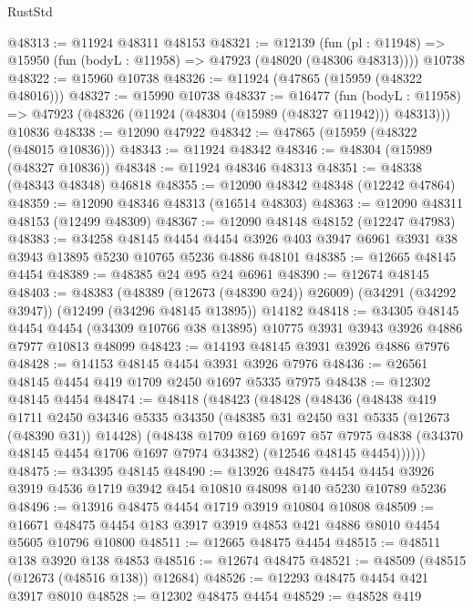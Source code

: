 \begin{lexlean}{RustStd}
\begin{coremodule}
{\begin{coremodule}
{{{{{{{{{{{{{{{{{{{{{{{{{{{{{{{{{{{{{{{{{{{{{{{{{{{{{{{{{{{{{{{{{{{{{{{{{{{{{{{{@48313 := @11924 @48311 @48153
@48321 := @12139
    (fun (pl : @11948) => @15950 (fun (bodyL : @11958) => @47923 (@48020 (@48306 @48313))))
    @10738
@48322 := @15960 @10738
@48326 := @11924 (@47865 (@15959 (@48322 @48016)))
@48327 := @15990 @10738
@48337 := @16477
    (fun (bodyL : @11958) => @47923 (@48326 (@11924 (@48304 (@15989 (@48327 @11942))) @48313)))
    @10836
@48338 := @12090 @47922
@48342 := @47865 (@15959 (@48322 (@48015 @10836)))
@48343 := @11924 @48342
@48346 := @48304 (@15989 (@48327 @10836))
@48348 := @11924 @48346 @48313
@48351 := @48338 (@48343 @48348) @46818
@48355 := @12090 @48342 @48348 (@12242 @47864)
@48359 := @12090 @48346 @48313 (@16514 @48303)
@48363 := @12090 @48311 @48153 (@12499 @48309)
@48367 := @12090 @48148 @48152 (@12247 @47983)
@48383 := @34258
    @48145
    @4454
    @4454
    @3926
    @403
    @3947
    @6961
    @3931
    @38
    @3943
    @13895
    @5230
    @10765
    @5236
    @4886
    @48101
@48385 := @12665 @48145 @4454
@48389 := @48385 @24 @95 @24 @6961
@48390 := @12674 @48145
@48403 := @48383
    (@48389 (@12673 (@48390 @24)) @26009)
    (@34291 (@34292 @3947))
    (@12499 (@34296 @48145 @13895))
    @14182
@48418 := @34305
    @48145
    @4454
    @4454
    (@34309 @10766 @38 @13895)
    @10775
    @3931
    @3943
    @3926
    @4886
    @7977
    @10813
    @48099
@48423 := @14193 @48145 @3931 @3926 @4886 @7976
@48428 := @14153 @48145 @4454 @3931 @3926 @7976
@48436 := @26561 @48145 @4454 @419 @1709 @2450 @1697 @5335 @7975
@48438 := @12302 @48145 @4454
@48474 := @48418
    (@48423
      (@48428
        (@48436
          (@48438
            @419
            @1711
            @2450
            @34346
            @5335
            @34350
            (@48385 @31 @2450 @31 @5335 (@12673 (@48390 @31)) @14428)
            (@48438
              @1709
              @169
              @1697
              @57
              @7975
              @4838
              (@34370 @48145 @4454 @1706 @1697 @7974 @34382)
              (@12546 @48145 @4454))))))
@48475 := @34395 @48145
@48490 := @13926
    @48475
    @4454
    @4454
    @3926
    @3919
    @4536
    @1719
    @3942
    @454
    @10810
    @48098
    @140
    @5230
    @10789
    @5236
@48496 := @13916 @48475 @4454 @1719 @3919 @10804 @10808
@48509 := @16671 @48475 @4454 @183 @3917 @3919 @4853 @421 @4886 @8010 @4454 @5605 @10796 @10800
@48511 := @12665 @48475 @4454
@48515 := @48511 @138 @3920 @138 @4853
@48516 := @12674 @48475
@48521 := @48509 (@48515 (@12673 (@48516 @138)) @12684)
@48526 := @12293 @48475 @4454 @421 @3917 @8010
@48528 := @12302 @48475 @4454
@48529 := @48528 @419
}}}}}}}}}}}}}}}}}}}}}}}}}}}}}}}}}}}}}}}}}}}}}}}}}}}}}}}}}}}}}}}}}}}}}}}}}}}}}}}}
\end{coremodule}}
\end{coremodule}
\end{lexlean}
